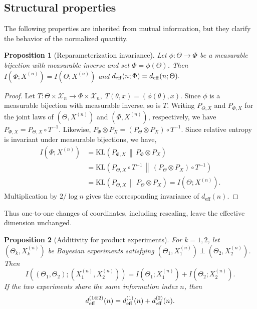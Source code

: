 \documentclass[11pt]{article}
\theoremstyle{plain}
\newtheorem{proposition}{Proposition}
\theoremstyle{definition}
\theoremstyle{remark}
\newcommand{\KL}{\mathrm{KL}}
\begin{document}
\subsection{Structural properties}
\label{subsec:basic-properties}

The following properties are inherited from mutual information, but they clarify the behavior of the normalized quantity.

\begin{proposition}[Reparameterization invariance]
	\label{prop:invariance}
	Let $\phi:\mathsf{\Theta}\to\mathsf{\Phi}$ be a measurable bijection with measurable inverse and set $\Phi=\phi(\Theta)$. Then $I(\Phi;X^{(n)})=I(\Theta;X^{(n)})$ and
	\(
	d_{\rm eff}(n;\Phi)=d_{\rm eff}(n;\Theta).
	\)
\end{proposition}

\begin{proof}
	Let
	\(
	T:\mathsf{\Theta}\times\mathcal X_n
	\longrightarrow
	\mathsf{\Phi}\times\mathcal X_n,
	\;
	T(\theta,x)=(\phi(\theta),x).
	\)
	Since \(\phi\) is a measurable bijection with measurable inverse, so is \(T\). Writing \(P_{\Theta,X}\) and \(P_{\Phi,X}\) for the joint laws of \((\Theta,X^{(n)})\) and \((\Phi,X^{(n)})\), respectively, we have
	\(
	P_{\Phi,X}=P_{\Theta,X}\circ T^{-1}.
	\)
	Likewise,
	\(
	P_\Phi\otimes P_X
	=
	(P_\Theta\otimes P_X)\circ T^{-1}.
	\) Since relative entropy is invariant under measurable bijections, we have,
	\[
	\begin{aligned}
		I(\Phi;X^{(n)})
		&=
		\KL\!\left(
		P_{\Phi,X}\,\middle\|\,P_\Phi\otimes P_X
		\right)\\
		&=
		\KL\!\left(
		P_{\Theta,X}\circ T^{-1}
		\,\middle\|\,
		(P_\Theta\otimes P_X)\circ T^{-1}
		\right)\\
		&=
		\KL\!\left(
		P_{\Theta,X}\,\middle\|\,P_\Theta\otimes P_X
		\right)
		=
		I(\Theta;X^{(n)}).
	\end{aligned}
	\]
	Multiplication by \(2/\log n\) gives the corresponding invariance of
	\(d_{\mathrm{eff}}(n)\).
\end{proof}


Thus one-to-one changes of coordinates, including rescaling, leave the effective dimension unchanged.

\begin{proposition}[Additivity for product experiments]
	\label{prop:additivity}
	For $k=1,2$, let $(\Theta_k,X_k^{(n)})$ be Bayesian experiments satisfying $(\Theta_1,X_1^{(n)})\perp(\Theta_2,X_2^{(n)})$. Then
	\[
	I\!\left((\Theta_1,\Theta_2);(X_1^{(n)},X_2^{(n)})\right)
	=
	I(\Theta_1;X_1^{(n)})
	+
	I(\Theta_2;X_2^{(n)}).
	\]
	If the two experiments share the same information index $n$, then
	\[
	d_{\rm eff}^{(1\otimes2)}(n)
	=
	d_{\rm eff}^{(1)}(n)+d_{\rm eff}^{(2)}(n).
	\]
\end{proposition}
\end{document}
